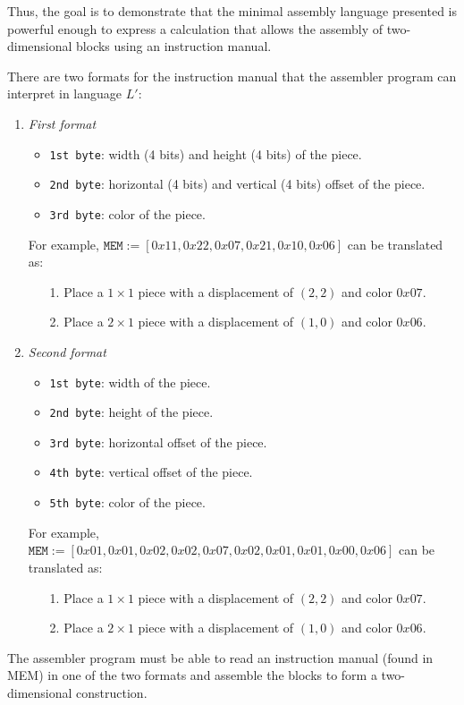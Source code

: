 \noindent 
Thus, the goal is to demonstrate that the minimal assembly language 
presented is powerful enough to express a calculation that allows the 
assembly of two-dimensional blocks using an instruction manual. 
\medskip

\noindent 
There are two formats for the instruction manual that the assembler 
program can interpret in language $L'$: 
\begin{enumerate} 
  \item \emph{First format} 
    \begin{itemize} 
      \item \texttt{1st byte}: width (4 bits) and height (4 bits) of 
      the piece. 
      \item \texttt{2nd byte}: horizontal (4 bits) and vertical (4 
        bits) offset of the piece. 
      \item \texttt{3rd byte}: color of the piece. 
    \end{itemize} 
    For example, 
    $\texttt{MEM} {:=} [0x11, 0x22, 0x07, 0x21, 0x10, 0x06]$ can be 
    translated as: 
    \begin{enumerate} 
      \item[1.] Place a $1 \times 1$ piece with a displacement of 
        $(2, 2)$ and color $0x07$. 
      \item[2.] Place a $2 \times 1$ piece with a displacement of 
        $(1, 0)$ and color $0x06$. 
    \end{enumerate} 
  \item \emph{Second format} 
    \begin{itemize} 
      \item \texttt{1st byte}: width of the piece. 
      \item \texttt{2nd byte}: height of the piece. 
      \item \texttt{3rd byte}: horizontal offset of the piece. 
      \item \texttt{4th byte}: vertical offset of the piece. 
      \item \texttt{5th byte}: color of the piece. 
    \end{itemize} 
    For example, $\texttt{MEM} {:=} [0x01, 0x01, 0x02, 0x02, 0x07, 
    0x02, 0x01, 0x01, 0x00, 0x06]$ can be translated as: 
    \begin{enumerate} 
      \item[1.] Place a $1 \times 1$ piece with a displacement of 
        $(2, 2)$ and color $0x07$. 
      \item[2.] Place a $2 \times 1$ piece with a displacement of 
        $(1, 0)$ and color $0x06$. 
    \end{enumerate}
\end{enumerate} 
The assembler program must be able to read an instruction manual 
(found in MEM) in one of the two formats and assemble the blocks to 
form a two-dimensional construction. 
\medskip

